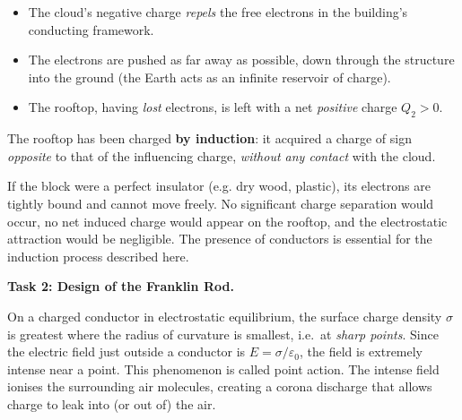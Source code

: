 \documentclass[11pt]{article}
\newcommand{\cle}[1]{{\popxbold\color{popdark}#1}}
\begin{document}
\begin{itemize}
\item The cloud's negative charge \emph{repels} the free electrons in the building's conducting framework.
\item The electrons are pushed as far away as possible, down through the structure into the ground (the Earth acts as an infinite reservoir of charge).
\item The rooftop, having \emph{lost} electrons, is left with a net \emph{positive} charge $Q_2 > 0$.
\end{itemize}

The rooftop has been charged \textbf{by induction}: it acquired a charge of sign \emph{opposite} to that of the influencing charge, \emph{without any contact} with the cloud.

\begin{attention}
If the block were a perfect insulator (e.g. dry wood, plastic), its electrons are tightly bound and cannot move freely. No significant charge separation would occur, no net induced charge would appear on the rooftop, and the electrostatic attraction would be negligible. The presence of conductors is essential for the induction process described here.
\end{attention}

\textbf{Task 2: Design of the Franklin Rod.}

\begin{definition}
On a charged conductor in electrostatic equilibrium, the surface charge density $\sigma$ is greatest where the radius of curvature is smallest, i.e.\ at \emph{sharp points}. Since the electric field just outside a conductor is $E = \sigma/\varepsilon_0$, the field is extremely intense near a point. This phenomenon is called \cle{point action}. The intense field ionises the surrounding air molecules, creating a corona discharge that allows charge to leak into (or out of) the air.
\end{definition}
\end{document}
